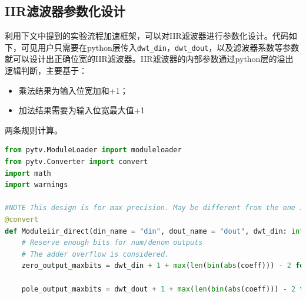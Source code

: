 \subsection{IIR滤波器参数化设计}
利用下文中提到的实验流程加速框架，可以对IIR滤波器进行参数化设计。代码如下，可见用户只需要在python层传入\texttt{dwt\_din}，\texttt{dwt\_dout}，以及滤波器系数等参数就可以设计出正确位宽的IIR滤波器。IIR滤波器的内部参数通过python层的溢出逻辑判断，主要基于：
\begin{itemize}
    \item 乘法结果为输入位宽加和+1；
    \item 加法结果需要为输入位宽最大值+1
\end{itemize}
两条规则计算。

\begin{lstlisting}[language=python,caption = {IIR滤波器的参数化设计}]
from pytv.ModuleLoader import moduleloader
from pytv.Converter import convert
import math
import warnings

#NOTE This design is for max precision. May be different from the one in the guideline.
@convert
def Moduleiir_direct(din_name = "din", dout_name = "dout", dwt_din: int = 12, dwt_dout: int = 12, if_rst_n = True, num_coeffs = [7,21,42,56], denom_coeffs = [-922, 1163, -811, 412, -122, 24, -2], zero_IP = True,zero_MULT_IP = "MULT", pole_MULT_IP = "MULT"):
    # Reserve enough bits for num/denom outputs
    # The adder overflow is considered.
    zero_output_maxbits = dwt_din + 1 + max(len(bin(abs(coeff))) - 2 for coeff in num_coeffs) + math.ceil(math.log2(len(num_coeffs))) # +1 for the addition, -2 for the '0b'
    
    pole_output_maxbits = dwt_dout + 1 + max(len(bin(abs(coeff))) - 2 for coeff in denom_coeffs) + math.ceil(math.log2(len(denom_coeffs))) # +1 for the addition
    

\end{lstlisting}
